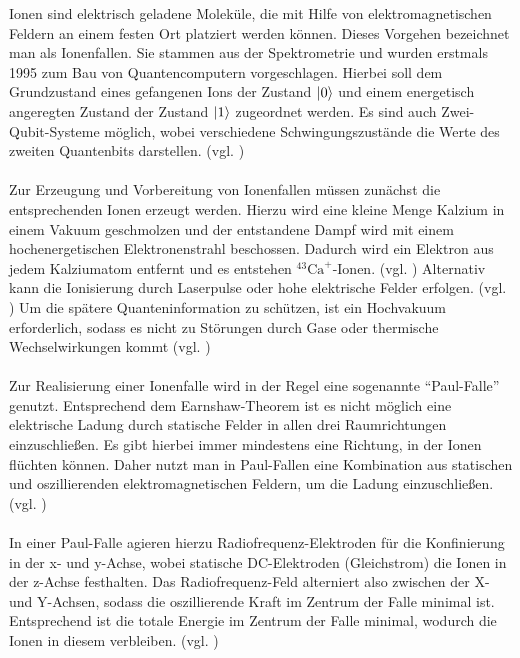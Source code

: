 Ionen sind elektrisch geladene Moleküle, die mit Hilfe von elektromagnetischen Feldern an einem festen Ort platziert werden können. Dieses Vorgehen bezeichnet man als Ionenfallen. Sie stammen aus der Spektrometrie und wurden erstmals 1995 zum Bau von Quantencomputern vorgeschlagen. Hierbei soll dem Grundzustand eines gefangenen Ions der Zustand $\ket0$ und einem energetisch angeregten Zustand der Zustand $\ket1$ zugeordnet werden. Es sind auch Zwei-Qubit-Systeme möglich, wobei verschiedene Schwingungszustände die Werte des zweiten Quantenbits darstellen. 
(vgl. \cite[Ch. 10.4]{homeister_quantum_2022-1})
\\
\\
Zur Erzeugung und Vorbereitung von Ionenfallen müssen zunächst die entsprechenden Ionen erzeugt werden. Hierzu wird eine kleine Menge Kalzium in einem Vakuum geschmolzen und der entstandene Dampf wird mit einem hochenergetischen Elektronenstrahl beschossen. Dadurch wird ein Elektron aus jedem Kalziumatom entfernt und es entstehen ${}^{43}\mathrm{Ca}^+$-Ionen. 
(vgl. \cite[Ch. 4.6.1]{kasirajan_fundamentals_2021}) %
Alternativ kann die Ionisierung durch Laserpulse oder hohe elektrische Felder erfolgen. (vgl. \cite[Ch. 21.1]{lapierre_getting_2022}) %
Um die spätere Quanteninformation zu schützen, ist ein Hochvakuum erforderlich, sodass es nicht zu Störungen durch Gase oder thermische Wechselwirkungen kommt (vgl. \cite[Ch. 4.6.1]{kasirajan_fundamentals_2021})
\\
\\
Zur Realisierung einer Ionenfalle wird in der Regel eine sogenannte ``Paul-Falle'' genutzt. Entsprechend dem Earnshaw-Theorem ist es nicht möglich eine elektrische Ladung durch statische Felder in allen drei Raumrichtungen einzuschließen. Es gibt hierbei immer mindestens eine Richtung, in der Ionen flüchten können. Daher nutzt man in Paul-Fallen eine Kombination aus statischen und oszillierenden elektromagnetischen Feldern, um die Ladung einzuschließen. (vgl. \cite[Ch. 21.1]{lapierre_getting_2022}) %
\\ \\
In einer Paul-Falle agieren hierzu Radiofrequenz-Elektroden für die Konfinierung in der x- und y-Achse, wobei statische DC-Elektroden (Gleichstrom) die Ionen in der z-Achse festhalten. Das Radiofrequenz-Feld alterniert also zwischen der X- und Y-Achsen, sodass die oszillierende Kraft im Zentrum der Falle minimal ist. Entsprechend ist die totale Energie im Zentrum der Falle minimal, wodurch die Ionen in diesem verbleiben. (vgl. \cite[Ch. 4.6.1]{kasirajan_fundamentals_2021}) \\
